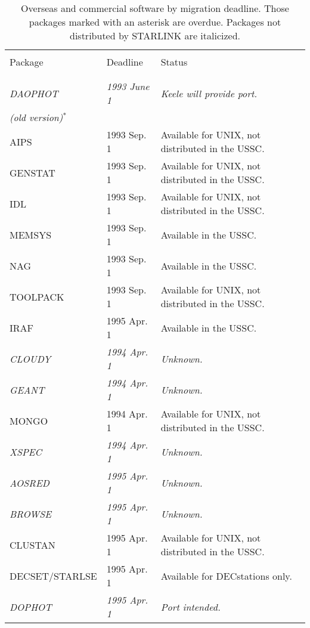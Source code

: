 \begin{table}
\begin{center}
\caption{Overseas and commercial software by migration deadline.
Those packages marked with an asterisk are overdue.
Packages not distributed by STARLINK are italicized.}
\vspace{5mm}
\begin{tabular}{|p{36mm}|p{30mm}|p{60mm}|} \hline \label{t_OCdead}
& & \\
Package & Deadline & Status \\
& & \\ \hline
& & \\
{\em DAOPHOT}         & {\em 1993 June 1} & {\em Keele will provide port.} \\
{\em (old version)}$^{\ast}$ &             & \\
AIPS                  & 1993 Sep. 1 & Available for UNIX, not distributed in
   the USSC. \\
GENSTAT               & 1993 Sep. 1 & Available for UNIX, not distributed in
   the USSC. \\
IDL                   & 1993 Sep. 1 & Available for UNIX, not distributed in
   the USSC. \\
MEMSYS                & 1993 Sep. 1 & Available in the USSC. \\
NAG                   & 1993 Sep. 1 & Available in the USSC. \\
TOOLPACK              & 1993 Sep. 1 & Available for UNIX, not distributed in
   the USSC. \\
IRAF                  & 1995 Apr. 1 & Available in the USSC. \\
{\em CLOUDY}          & {\em 1994 Apr. 1} & {\em Unknown.} \\
{\em GEANT}           & {\em 1994 Apr. 1} & {\em Unknown.} \\
MONGO                 & 1994 Apr. 1 & Available for UNIX, not distributed in
   the USSC. \\
{\em XSPEC}           & {\em 1994 Apr. 1} & {\em Unknown.} \\
{\em AOSRED}          & {\em 1995 Apr. 1} & {\em Unknown.} \\
{\em BROWSE}          & {\em 1995 Apr. 1} & {\em Unknown.} \\
CLUSTAN               & 1995 Apr. 1 & Available for UNIX, not distributed in
   the USSC. \\
DECSET/STARLSE        & 1995 Apr. 1 & Available for DECstations only. \\
{\em DOPHOT}          & {\em 1995 Apr. 1} & {\em Port intended.} \\

\end{tabular}
\end{center}
\end{table}
